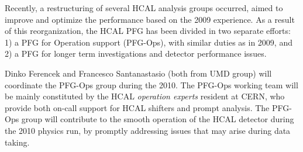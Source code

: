 \documentclass[a4paper,11pt]{article}
\begin{document}
Recently, a restructuring of several HCAL analysis groups occurred, 
aimed to improve and optimize the performance based on the 2009 experience. 
As a result of this reorganization, the HCAL PFG has been divided in 
two separate efforts: 1) a PFG for Operation support (PFG-Ops), with similar 
duties as in 2009, and 2) a PFG for longer term investigations and 
detector performance issues.

Dinko Ferencek and Francesco Santanastasio (both from UMD group) 
will coordinate the PFG-Ops group during the 2010. 
The PFG-Ops working team will be mainly constituted by the HCAL \textit{operation experts} resident at CERN, 
who provide both on-call support for HCAL shifters and prompt analysis. 
The PFG-Ops group will contribute to the smooth operation of the HCAL detector during 
the 2010 physics run, by promptly addressing issues that may arise during data taking.
%
\end{document}
